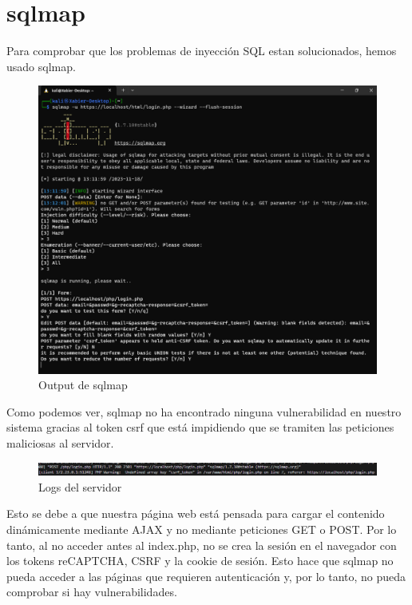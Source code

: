 \documentclass{report}
\begin{document}
        \section{sqlmap}
            Para comprobar que los problemas de inyección SQL estan solucionados, hemos usado sqlmap.
            \begin{figure}[H]
                \centering
                \includegraphics[width=\textwidth]{./img/audit2/sqlmap1.png}
                \caption{Output de sqlmap}
            \end{figure}
            Como podemos ver, sqlmap no ha encontrado ninguna vulnerabilidad en nuestro sistema gracias al token csrf que está impidiendo que se tramiten las peticiones maliciosas al servidor.
            \clearpage
            \begin{figure}[H]
                \centering
                \includegraphics[width=\textwidth]{./img/audit2/sqlmap2.png}
                \caption{Logs del servidor}
            \end{figure}
            Esto se debe a que nuestra página web está pensada para cargar el contenido dinámicamente mediante AJAX y no mediante peticiones GET o POST.
            Por lo tanto, al no acceder antes al index.php, no se crea la sesión en el navegador con los tokens reCAPTCHA, CSRF y la cookie de sesión.
            Esto hace que sqlmap no pueda acceder a las páginas que requieren autenticación y, por lo tanto, no pueda comprobar si hay vulnerabilidades.
        \clearpage
\end{document}
